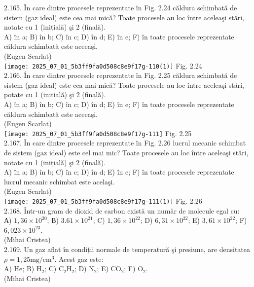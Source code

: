 2.165. În care dintre procesele reprezentate în Fig. 2.24 căldura schimbată de sistem (gaz ideal) este cea mai mică? Toate procesele au loc între aceleaşi stări, notate cu 1 (inițială) şi 2 (finală).\\ A) în a; B) în b; C) în c; D) în d; E) în e; F) în toate procesele reprezentate căldura schimbată este aceeaşi.\\ (Eugen Scarlat)\\ \texttt{[image: 2025\_07\_01\_5b3ff9fa0d508c8e9f17g-110(1)]} Fig. 2.24\\

2.166. În care dintre procesele reprezentate în Fig. 2.25 căldura schimbată de sistem (gaz ideal) este cea mai mică? Toate procesele au loc între aceleaşi stări, potate cu 1 (initială) şi 2 (finală).\\ A) în a; B) în b; C) în c; D) în d; E) în e; F) în toate procesele reprezentate căldura schimbată este aceeaşi.\\ (Eugen Scarlat)\\ \texttt{[image: 2025\_07\_01\_5b3ff9fa0d508c8e9f17g-111]} Fig. 2.25\\

2.167. În care dintre procesele reprezentate în Fig. 2.26 lucrul mecanic schimbat de sistem (gaz ideal) este cel mai mic? Toate procesele au loc între aceleaşi stări, notate cu 1 (inițială) şi 2 (finală).\\ A) în a; B) în b; C) în c; D) în d; E) în e; F) în toate procesele reprezentate lucrul mecanic schimbat este acelaşi.\\ (Eugen Scarlat)\\ \texttt{[image: 2025\_07\_01\_5b3ff9fa0d508c8e9f17g-111(1)]} Fig. 2.26\\

2.168. Într-un gram de dioxid de carbon există un număr de molecule egal cu:\\ А) $1,36 \times 10^{20}$; В) $3.61 \times 10^{21}$; C) $1,36 \times 10^{22}$; D) $6,31 \times 10^{22}$; E) $3,61 \times 10^{22}$; F) $6,023 \times 10^{23}$.\\ (Mihai Cristea)\\

2.169. Un gaz aflat în condiții normale de temperatură şi presiune, are densitatea $\rho=1,25 \mathrm{mg} / \mathrm{cm}^{3}$. Acest gaz este:\\ A) He; B) $\mathrm{H}_{2}$; C) $\mathrm{C}_{2} \mathrm{H}_{2}$; D) $\mathrm{N}_{2}$; E) $\mathrm{CO}_{2}$; F) $\mathrm{O}_{2}$.\\ (Mihai Cristea)\\

